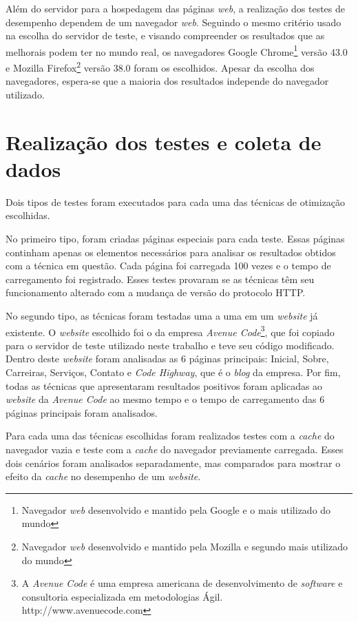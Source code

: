Além do servidor para a hospedagem das páginas \textit{web}, a realização dos testes de desempenho dependem de um navegador \textit{web}. Seguindo o mesmo critério usado na escolha do servidor de teste, e visando compreender os resultados que as melhorais podem ter no mundo real, os navegadores Google Chrome\footnote{Navegador \textit{web} desenvolvido e mantido pela Google e o mais utilizado do mundo} versão 43.0 e Mozilla Firefox\footnote{Navegador \textit{web} desenvolvido e mantido pela Mozilla e segundo mais utilizado do mundo} versão 38.0 foram os escolhidos. Apesar da escolha dos navegadores, espera-se que a maioria dos resultados independe do navegador utilizado.

\section{Realização dos testes e coleta de dados}

Dois tipos de testes foram executados para cada uma das técnicas de otimização escolhidas.

No primeiro tipo, foram criadas páginas especiais para cada teste. Essas páginas continham apenas os elementos necessários para analisar os resultados obtidos com a técnica em questão. Cada página foi carregada 100 vezes e o tempo de carregamento foi registrado. Esses testes provaram se as técnicas têm seu funcionamento alterado com a mudança de versão do protocolo HTTP.

No segundo tipo, as técnicas foram testadas uma a uma em um \textit{website} já existente. O \textit{website} escolhido foi o da empresa \textit{Avenue Code}\footnote{A \textit{Avenue Code} é uma empresa americana de desenvolvimento de \textit{software} e consultoria especializada em metodologias Ágil. http://www.avenuecode.com}, que foi copiado para o servidor de teste utilizado neste trabalho e teve seu código modificado. Dentro deste \textit{website} foram analisadas as 6 páginas principais: Inicial, Sobre, Carreiras, Serviços, Contato e \textit{Code Highway}, que é o \textit{blog} da empresa. Por fim, todas as técnicas que apresentaram resultados positivos foram aplicadas ao \textit{website} da \textit{Avenue Code} ao mesmo tempo e o tempo de carregamento das 6 páginas principais foram analisados.

Para cada uma das técnicas escolhidas foram realizados testes com a \textit{cache} do navegador vazia e teste com a \textit{cache} do navegador previamente carregada. Esses dois cenários foram analisados separadamente, mas comparados para mostrar o efeito da \textit{cache} no desempenho de um \textit{website}.

